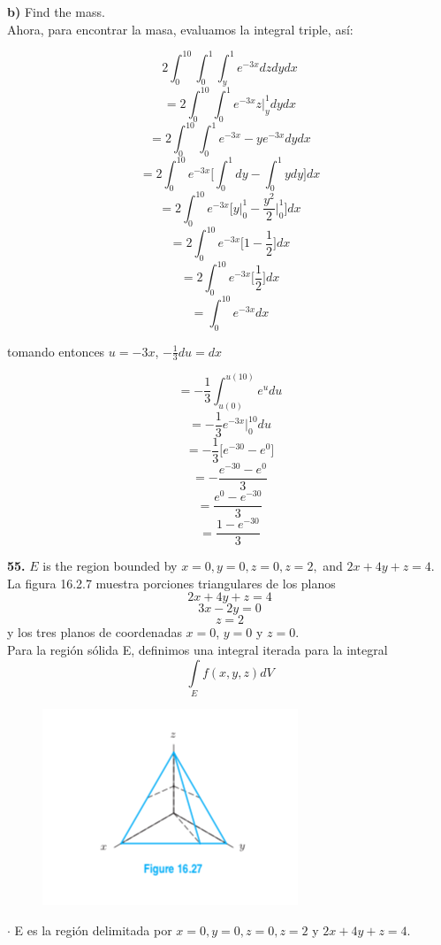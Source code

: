 \documentclass[11pt]{report}
\begin{document}
\textbf{b)} Find the mass. \\

	Ahora, para encontrar la masa, evaluamos la integral triple, así:

	$$ 2 \int_{0}^{10}\int_{0}^{1}\int_{y}^{1} e^{-3x} dz dy dx  $$
	$$ =  2 \int_{0}^{10}\int_{0}^{1} e^{-3x} z \Big|_{y}^{1} dy dx  $$
	$$ =  2 \int_{0}^{10}\int_{0}^{1} e^{-3x} - ye^{-3x}  dy dx  $$
	$$ =  2 \int_{0}^{10} e^{-3x} \Big[\int_{0}^{1} dy - \int_{0}^{1} y dy \Big] dx  $$
	$$ =  2 \int_{0}^{10} e^{-3x} \Big[ y \Big|_{0}^{1} - \frac{y^2}{2} \Big|_{0}^{1} \Big] dx  $$
	$$ =  2 \int_{0}^{10} e^{-3x} \Big[ 1 - \frac{1}{2} \Big] dx  $$
	$$ =  2 \int_{0}^{10} e^{-3x} \Big[ \frac{1}{2} \Big] dx  $$
	$$ =  \int_{0}^{10} e^{-3x} dx  $$

tomando entonces $u = -3x$, $ - \frac{1}{3} du = dx$

	$$ = - \frac{1}{3} \int_{u(0)}^{u(10)} e^{u} du  $$
	$$ = - \frac{1}{3}  e^{-3x} \Big|_{0}^{10} du  $$
	$$ = - \frac{1}{3} \Big[ e^{-30} - e^0 \Big]  $$
	$$ = - \frac{ e^{-30} - e^0  }{3}  $$
	$$ = \frac{ e^0 - e^{-30} }{3}  $$
	$$ = \frac{ 1 - e^{-30} }{3}  $$


\textbf{55.} $E$ is the region bounded by $x = 0, y = 0, z = 0, z = 2,$
and $2x + 4y + z = 4$. \\


La figura 16.2.7 muestra porciones triangulares de los planos
	$$ 2x + 4y + z = 4 $$
	$$ 3x - 2y = 0$$
	$$ z = 2$$
y los tres planos de coordenadas $x = 0$, $y = 0$ y $z = 0$.\\

Para la región sólida E, definimos una integral iterada para la integral
	$$ \int\limits_{E} f(x,y,z) dV $$

\begin{figure}[H]
	\includegraphics[scale=0.3]{triangle.png}
	\centering
\end{figure}

$\cdot$ E es la región delimitada por $x = 0, y = 0, z = 0, z = 2$ y $2x + 4y + z = 4$.\\
\end{document}
